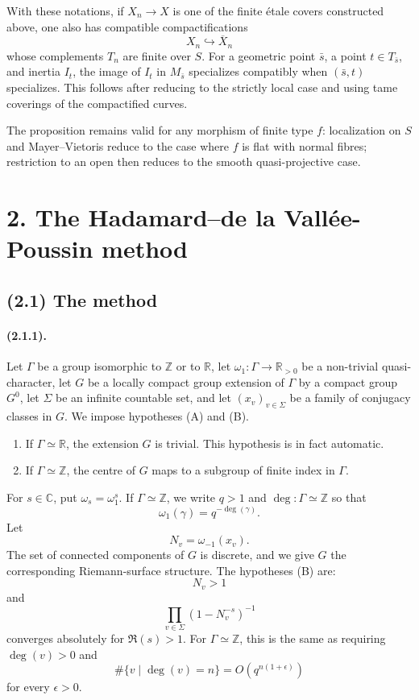 \documentclass[11pt]{article}
\theoremstyle{remark}
\newcommand{\ZZ}{\mathbb{Z}}
\newcommand{\CC}{\mathbb{C}}
\newcommand{\RR}{\mathbb{R}}
\begin{document}
With these notations, if \(X_n\to X\) is one of the finite étale covers constructed above, one also has compatible compactifications
\[
X_n\hookrightarrow \overline X_n
\]
whose complements \(T_n\) are finite over \(S\). For a geometric point \(\bar s\), a point \(t\in T_{\bar s}\), and inertia \(I_t\), the image of \(I_t\) in \(M_{\bar s}\) specializes compatibly when \((\bar s,t)\) specializes. This follows after reducing to the strictly local case and using tame coverings of the compactified curves.

The proposition remains valid for any morphism of finite type \(f\): localization on \(S\) and Mayer--Vietoris reduce to the case where \(f\) is flat with normal fibres; restriction to an open then reduces to the smooth quasi-projective case.

\section*{2. The Hadamard--de la Vallée-Poussin method}

\subsection*{(2.1) The method}

\paragraph{(2.1.1).}
Let \(\Gamma\) be a group isomorphic to \(\ZZ\) or to \(\RR\), let \(\omega_1:\Gamma\to\RR_{>0}\) be a non-trivial quasi-character, let \(G\) be a locally compact group extension of \(\Gamma\) by a compact group \(G^0\), let \(\Sigma\) be an infinite countable set, and let \((x_v)_{v\in\Sigma}\) be a family of conjugacy classes in \(G\). We impose hypotheses (A) and (B).

\begin{enumerate}[label=(A\arabic*)]
\item If \(\Gamma\simeq\RR\), the extension \(G\) is trivial. This hypothesis is in fact automatic.
\item If \(\Gamma\simeq\ZZ\), the centre of \(G\) maps to a subgroup of finite index in \(\Gamma\).
\end{enumerate}

For \(s\in\CC\), put \(\omega_s=\omega_1^s\). If \(\Gamma\simeq\ZZ\), we write \(q>1\) and \(\deg:\Gamma\simeq\ZZ\) so that
\[
\omega_1(\gamma)=q^{-\deg(\gamma)}.
\]
Let
\[
N_v=\omega_{-1}(x_v).
\]
The set of connected components of \(G\) is discrete, and we give \(G\) the corresponding Riemann-surface structure. The hypotheses (B) are:
\[
N_v>1
\]
and
\[
\prod_{v\in\Sigma}(1-N_v^{-s})^{-1}
\]
converges absolutely for \(\Re(s)>1\). For \(\Gamma\simeq\ZZ\), this is the same as requiring \(\deg(v)>0\) and
\[
\#\{v\mid \deg(v)=n\}=O(q^{n(1+\epsilon)})
\]
for every \(\epsilon>0\).
\end{document}
